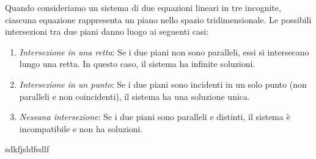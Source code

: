 \documentclass{article}
\begin{document}
Quando consideriamo un sistema di due equazioni lineari in tre incognite,
ciascuna equazione rappresenta un piano nello spazio tridimensionale. Le
possibili intersezioni tra due piani danno luogo ai seguenti casi:
\begin{enumerate}
	\item \emph{Intersezione in una retta}: Se i due piani non sono paralleli, essi si intersecano lungo una retta. In questo caso, il sistema ha infinite soluzioni.
	\item \emph{Intersezione in un punto}: Se i due piani sono incidenti in un solo punto (non paralleli e non coincidenti), il sistema ha una soluzione unica.
	\item \emph{Nessuna intersezione}: Se i due piani sono paralleli e distinti, il sistema è incompatibile e non ha soluzioni.
\end{enumerate}
sdkfjsldfsdlf
\end{document}
